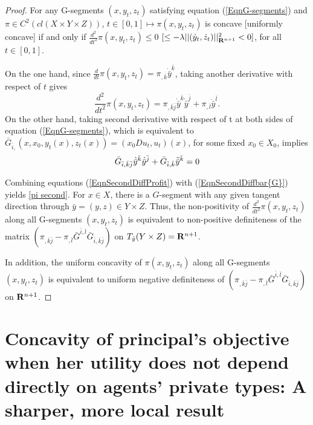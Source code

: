 \begin{proof}%
	For any G-segments $(x, y_t, z_t)$ satisfying equation (\ref{EqnG-segments}) and $\pi \in C^2(cl(X\times Y \times Z)
	)$,
	$t\in[0,1] \longmapsto \pi(x, y_t ,z_t)$ is concave [uniformly concave] if and only if $\frac{d^2}{dt^2} \pi(x, y_t, z_t)\le  0$ $[\le -\lambda ||(\dot{y}_t,\dot{z}_t)||^2_{{\mathbf R}^{n+1}}<0]$, for all $t \in [0,1]$.
	
	On the one hand, since $\frac{d}{dt}\pi(x, y_t, z_t) = \pi_{,\bar{k}} \dot{\bar y}^{\bar{k}}$, taking another derivative with respect of $t$ gives 
	\begin{equation}\label{EqnSecondDiffProfit}
	\frac{d^2}{dt^2} \pi(x, y_t, z_t) = 
	\pi_{,\bar{k}\bar{j}}\dot{\bar y}^{\bar{k}} \dot{\bar y}^{\bar{j}}+ \pi_{,\bar{l}}\ddot {\bar y}^{\bar{l}}.
	\end{equation}
	On the other hand, taking second derivative with respect of t at both sides of equation (\ref{EqnG-segments}), which is equivalent to $\bar{G}_{\bar{i},}(x, x_0, y_t(x), z_t(x)) = (x_0Du_t, u_t)(x)$, for some fixed $x_0\in X_0$, implies
	\begin{equation}\label{EqnSecondDiffbar{G}}
	\bar{G}_{\bar{i},\bar{k}\bar{j}}\dot{\bar y}^{\bar{k}} \dot {\bar y}^{\bar{j}}+\bar{G}_{\bar{i},\bar{k}} \ddot{\bar y}^{\bar{k}} =0 
	\end{equation}
	
	Combining equations (\ref{EqnSecondDiffProfit}) with (\ref{EqnSecondDiffbar{G}}) yields
	\eqref{pi second}.
	For $x \in X$, there is a $G$-segment with any given tangent direction through $\bar y = (y,z) \in Y \times Z$.
	Thus, the non-positivity  of $\frac{d^2}{dt^2} \pi(x, y_t, z_t)$ along all G-segments $(x, y_t, z_t)$ is equivalent to non-positive  definiteness of the matrix $(\pi_{,\bar{k}\bar{j}}- \pi_{,\bar{l}} \bar{G}^{\bar i,\bar l}\bar{G}_{\bar{i},\bar{k}\bar{j}})$ on $T_{\bar y} (Y\times Z)={\mathbf R}^{n+1}$.
	
	In addition, the uniform concavity of $\pi(x, y_t, z_t)$ along all G-segments $(x, y_t, z_t)$ is equivalent to uniform negative definiteness of $(\pi_{,\bar{k}\bar{j}}- \pi_{,\bar{l}} \bar{G}^{\bar i,\bar l}\bar{G}_{\bar{i},\bar{k}\bar{j}})$ on ${\mathbf R}^{n+1}$.
\end{proof}









\section{Concavity of principal's objective when her utility does not depend directly on agents' private types:  
	A sharper, more local result} 
\label{section:privateInformation}


